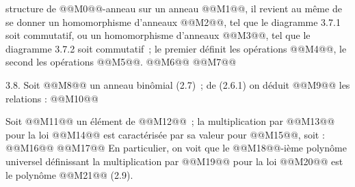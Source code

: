 
structure de @@M0@@-anneau sur un anneau @@M1@@, il revient au même de se donner un homomorphisme d'anneaux @@M2@@, tel que le diagramme 3.7.1 soit commutatif, ou un homomorphisme d'anneaux @@M3@@, tel que le diagramme 3.7.2 soit commutatif~; le premier définit les opérations @@M4@@, le second les opérations @@M5@@.
@@M6@@
@@M7@@

3.8. Soit @@M8@@ un anneau binômial (2.7)~; de (2.6.1) on déduit @@M9@@ les relations :
@@M10@@

Soit @@M11@@ un élément de @@M12@@~; la multiplication par @@M13@@ pour la loi @@M14@@ est caractérisée par sa valeur pour @@M15@@, soit :
@@M16@@
@@M17@@
En particulier, on voit que le @@M18@@-ième polynôme universel définissant la multiplication par @@M19@@ pour la loi @@M20@@ est le polynôme @@M21@@ (2.9).

